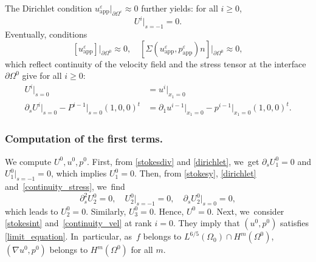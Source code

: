 \documentclass[10pt]{amsart}
\newcommand{\app}{\mathrm{app}}
\theoremstyle{plain}
\theoremstyle{definition}
\let\pa\partial
\let\na\nabla
\let\eps\varepsilon
\begin{document}
The Dirichlet condition $u^\eps_{\app}\vert_{\pa \Omega^\eps} \approx 0$ further yields: for all $i \ge 0$,
\begin{equation} \label{dirichlet}
U^i\vert_{s = -1} = 0.
\end{equation}
Eventually, conditions
\[
[u^\eps_{\app}]\vert_{\pa \Omega^0} \approx 0, \quad [\Sigma(u^\eps_{\app},p^\eps_{\app})n]\vert_{\pa \Omega^0} \approx 0,
\]
which reflect continuity of the velocity field and the stress tensor at the interface $\pa \Omega^0$ give for all $i \ge 0$:
\begin{align}
U^i\vert_{s=0} & = u^i\vert_{x_1=0} \label{continuity_vel} \\
\pa_s U^i \vert_{s=0} - P^{i-1}\vert_{s=0} (1,0,0)^t & = \pa_1 u^{i-1}\vert_{x_1=0} - p^{i-1}\vert_{x_1=0} (1,0,0)^t. \label{continuity_stress}
\end{align}

\subsubsection*{Computation of the first terms.} We compute $U^0, u^0,p^0$. First, from \eqref{stokesdiv} and \eqref{dirichlet}, we~get $\pa_s U^0_1 = 0$ and $U^0_1\vert_{s=-1} = 0$, which implies $U^0_1 = 0$. Then, from \eqref{stokesy}, \eqref{dirichlet} and~\eqref{continuity_stress}, we~find
\[
\pa^2_s U^0_2 = 0, \quad U^0_2\vert_{s=-1} = 0, \quad \pa_s U^0_2\vert_{s=0} = 0,
\]
which leads to $U^0_2 = 0$. Similarly, $U^0_3 = 0$. Hence, $U^0 = 0$. Next, we~consider \eqref{stokesint} and~\eqref{continuity_vel} at rank $i=0$. They imply that $(u^0,p^0)$ satisfies \eqref{limit_equation}. In~particular, as~$f$ belongs to $L^{6/5}(\Omega_0) \cap H^m(\Omega^0)$, $(\na u^0,p^0)$ belongs to $H^m(\Omega^0)$ for all $m$.
\end{document}
